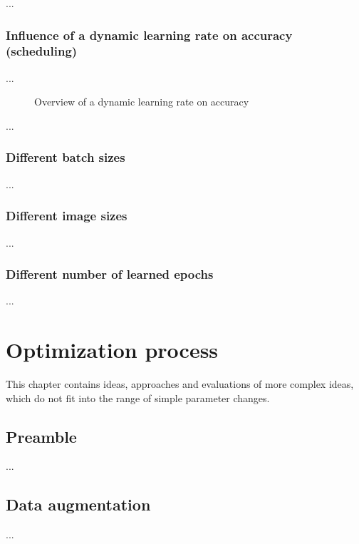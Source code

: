 \documentclass[10pt]{article}
\newcommand\inputpgf[2]{{
\let\pgfimageWithoutPath\pgfimage
\renewcommand{\pgfimage}[2][]{\pgfimageWithoutPath[##1]{#1/##2}}

}}
\begin{document}
				\noindent ...
		
			\subsubsection{Influence of a dynamic learning rate on accuracy (scheduling)}

				\noindent ...

				\begin{figure}[H]
					\begin{center}
						\inputpgf{images/evaluation}{scheduling_learning_rate.pgf}
					\end{center}
					\caption{Overview of a dynamic learning rate on accuracy}
					\label{fig:evaluation_scheduling_learning_rate}
				\end{figure}

				\noindent ...
		
			\subsubsection{Different batch sizes}
	
				\noindent ...
		
			\subsubsection{Different image sizes}
	
				\noindent ...
		
			\subsubsection{Different number of learned epochs}
	
				\noindent ...


	
	\section{Optimization process}
		This chapter contains ideas, approaches and evaluations of more complex ideas, which do not fit into the range of simple parameter changes.
	
		\subsection{Preamble}
			\noindent ...

		\subsection{Data augmentation}
			\noindent ...
\end{document}
